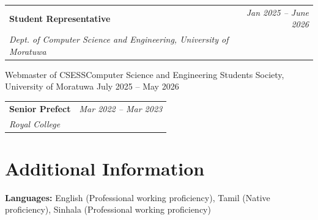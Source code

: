 \documentclass[a4paper,11pt]{article}
\makeatletter
\newcommand{\resumeProject}[4]{
\vspace{0.5mm}\item
    \begin{tabular*}{0.98\textwidth}[t]{l@{\extracolsep{\fill}}r}
        \textbf{#1} & \textit{\small{#3}} \\
        \small{\textit{#2}} & \small{#4}
    \end{tabular*}
    \vspace{-2.4mm}
}
\newcommand{\resumeSubHeadingListEnd}{\end{itemize}\vspace{2mm}}
\makeatother
\begin{document}
\resumeProject
  {Student Representative}{Dept. of Computer Science and Engineering, University of Moratuwa}
  {Jan 2025 -- June 2026}

\resumeProject
  {Webmaster of CSESS}{Computer Science and Engineering Students Society, University of Moratuwa}
  {July 2025 -- May 2026}
  {}{}

\resumeProject
  {Senior Prefect}{Royal College}
  {Mar 2022 -- Mar 2023}


\resumeSubHeadingListEnd

\vspace{-4mm}
\section{\textbf{Additional Information}}
\vspace{-0.4mm}
\small{
\textbf{Languages:} English (Professional working proficiency), Tamil (Native proficiency), Sinhala (Professional working proficiency)

}


\vspace{-1mm}
\end{document}
